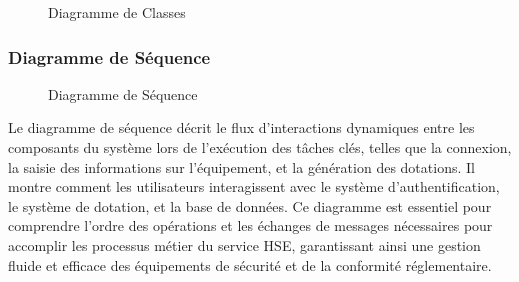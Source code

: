 \documentclass[a4paper,12pt]{report}
\begin{document}
\vspace{1cm}
\begin{figure}[H]
    \centering
    \caption{Diagramme de Classes}
\end{figure}

\subsubsection{Diagramme de Séquence}


\vspace{1cm}
\begin{figure}[H]
    \centering
    \caption{Diagramme de Séquence}
\end{figure}

Le diagramme de séquence décrit le flux d'interactions dynamiques entre les composants du système lors de l'exécution des tâches clés, telles que la connexion, la saisie des informations sur l'équipement, et la génération des dotations. Il montre comment les utilisateurs interagissent avec le système d'authentification, le système de dotation, et la base de données. Ce diagramme est essentiel pour comprendre l'ordre des opérations et les échanges de messages nécessaires pour accomplir les processus métier du service HSE, garantissant ainsi une gestion fluide et efficace des équipements de sécurité et de la conformité réglementaire.
\end{document}

